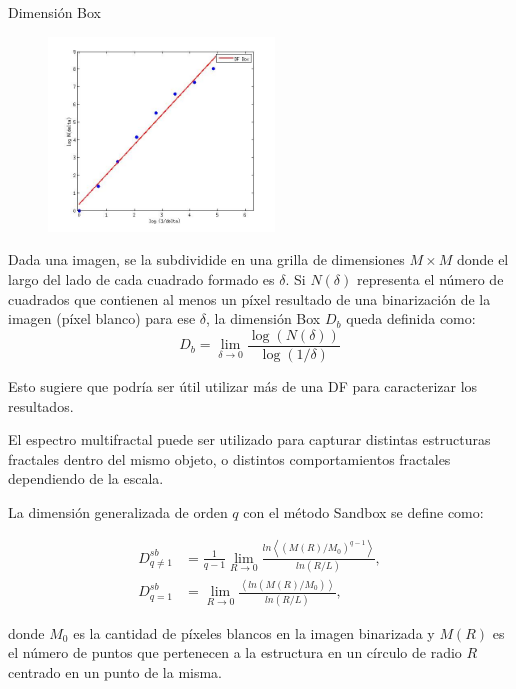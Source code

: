 \documentclass[spanish]{beamer}
\begin{document}
\begin{frame}{Dimensión Box}

\begin{figure}
\includegraphics[width=6cm]{../figures/fitbox}
\end{figure}

Dada una imagen, se la subdividide en una grilla de dimensiones $M\times M$ donde el largo del lado de cada cuadrado formado es $\delta$. Si $N(\delta)$ representa el n\'umero de cuadrados que contienen al menos un p\'ixel resultado de una binarizaci\'on de la imagen (p\'ixel blanco) para ese $\delta$, la dimensi\'on Box $D_{b}$ queda definida como:\\

$$D_{b} = \displaystyle\lim_{\delta \to 0}{\frac{\log(N(\delta))}{\log (1/\delta)}}$$


\end{frame}

\begin{frame}
Esto sugiere que podría ser útil utilizar más de una DF para caracterizar los resultados.

El espectro multifractal puede ser utilizado para capturar distintas estructuras fractales dentro del mismo objeto, o distintos comportamientos fractales dependiendo de la escala.

La dimensión generalizada de orden $q$ con el método Sandbox se define como:

 \begin{align*}
D_{q\ne 1}^{sb} &= \frac{1}{q-1} \lim_{R \rightarrow 0}{
\frac{ln   { \left\langle  (M(R)/M_{0})^{q-1} \right\rangle   }}
{ln {(R/L)}       }},\\
D_{q=1}^{sb} &= \lim_{R \rightarrow 0}{
\frac{ \left\langle ln   { (M(R)/M_{0})  }  \right\rangle}
{ln {(R/L)}       }},
\end{align*}

\noindent donde $M_{0}$ es la cantidad de píxeles blancos en la imagen binarizada y $M(R)$ es el número de puntos que pertenecen a la estructura en un círculo de radio $R$ centrado en un punto de la misma.
\end{frame}
\end{document}
